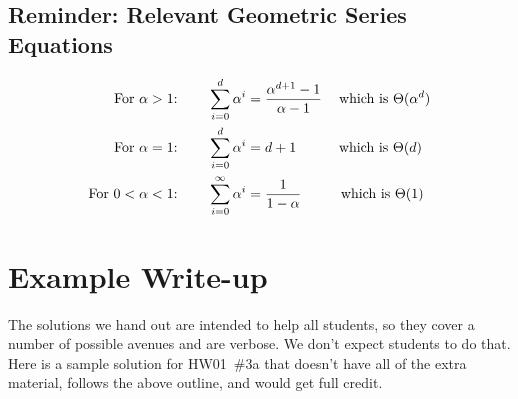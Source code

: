 \documentclass[11pt]{article}
\begin{document}
\subsection*{Reminder: Relevant Geometric Series Equations}

\begin{align*}
    \text{For }\alpha > 1 \text{: \; \; \;} &\sum_{i = 0}^{d} \alpha^i = \frac{\alpha^{d+1} - 1}{\alpha - 1} \text{\; \; which is } \Theta(\alpha^d) \\
     \text{For }\alpha = 1 \text{: \; \; \;} &\sum_{i = 0}^{d} \alpha^i = d+1 \text{\; \; \; \; \;  which is } \Theta(d) \\
    \text{For }0 < \alpha < 1 \text{: \; \; \;} &\sum_{i = 0}^{\infty} \alpha^i = \frac{1}{1-\alpha} \text{\; \; \; \, \, which is } \Theta(1)
\end{align*}

\section{Example Write-up}
The solutions we hand out are intended to help all students, so they cover a number of possible avenues and are verbose. We don't expect students to do that. Here is a sample solution for \mbox{HW01 \#3a} that doesn't have all of the extra material, follows the above outline, and would get full credit.
\end{document}

